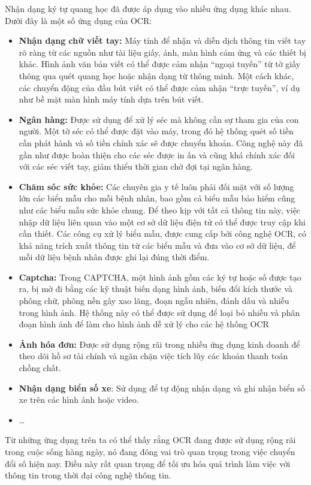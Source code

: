 Nhận dạng ký tự quang học đã được áp dụng vào nhiều ứng dụng khác nhau. Dưới đây là một  số ứng dụng của OCR: \cite{survey_ocr_Applications}
\begin{itemize}
    \item \textbf{Nhận dạng chữ viết tay:} Máy tính để nhận và diễn dịch thông tin viết tay rõ ràng từ các nguồn như tài liệu giấy, ảnh, màn hình cảm ứng và các thiết bị khác. Hình ảnh văn bản viết có thể được cảm nhận ``ngoại tuyến'' từ tờ giấy thông qua quét quang học hoặc nhận dạng từ thông minh. Một cách khác, các chuyển động của đầu bút viết có thể được cảm nhận ``trực tuyến'', ví dụ như bề mặt màn hình máy tính dựa trên bút viết.
    \item \textbf{Ngân hàng:} Được sử dụng để xử lý séc mà không cần sự tham gia của con người. Một tờ séc có thể được đặt vào máy, trong đó hệ thống quét số tiền cần phát hành và số tiền chính xác sẽ được chuyển khoản. Công nghệ này đã gần như được hoàn thiện cho các séc được in ấn và cũng khá chính xác đối với các séc viết tay, giảm thiểu thời gian chờ đợi tại ngân hàng.
    \item \textbf{Chăm sóc sức khỏe:} Các chuyên gia y tế luôn phải đối mặt với số lượng lớn các biểu mẫu cho mỗi bệnh nhân, bao gồm cả biểu mẫu bảo hiểm cũng như các biểu mẫu sức khỏe chung. Để theo kịp với tất cả thông tin này, việc nhập dữ liệu liên quan vào một cơ sở dữ liệu điện tử có thể được truy cập khi cần thiết. Các công cụ xử lý biểu mẫu, được cung cấp bởi công nghệ OCR, có khả năng trích xuất thông tin từ các biểu mẫu và đưa vào cơ sở dữ liệu, để mỗi dữ liệu bệnh nhân được ghi lại đúng thời điểm.
    \item \textbf{Captcha:} Trong CAPTCHA, một hình ảnh gồm các ký tự hoặc số được tạo ra, bị mờ đi bằng các kỹ thuật biến dạng hình ảnh, biến đổi kích thước và phông chữ, phông nền gây xao lãng, đoạn ngẫu nhiên, đánh dấu và nhiễu trong hình ảnh. Hệ thống này có thể được sử dụng để loại bỏ nhiễu và phân đoạn hình ảnh để làm cho hình ảnh dễ xử lý cho các hệ thống OCR
    \item \textbf{Ảnh hóa đơn:} Được sử dụng rộng rãi trong nhiều ứng dụng kinh doanh để theo dõi hồ sơ tài chính và ngăn chặn việc tích lũy các khoản thanh toán chồng chất.
    \item \textbf{Nhận dạng biển số xe}: Sử dụng để tự động nhận dạng và ghi nhận biển số xe trên các hình ảnh hoặc video.
    \item \ldots
\end{itemize}

Từ những ứng dụng trên ta có thể thấy rằng OCR đang được sử dụng rộng rãi trong cuộc sống hàng ngày, nó đang đóng vai trò quan trọng trong việc chuyển đổi số hiện nay. Điều này rất quan trọng để tối ưu hóa quá trình làm việc với thông tin trong thời đại công nghệ thông tin.


